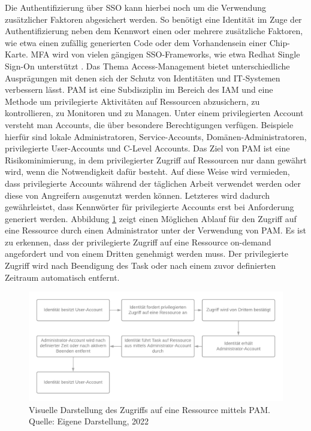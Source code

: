 Die Authentifizierung über SSO kann hierbei noch um die Verwendung zusätzlicher Faktoren abgesichert werden. So benötigt eine Identität im Zuge der Authentifizierung neben dem Kennwort einen oder mehrere zusätzliche Faktoren, wie etwa einen zufällig generierten Code oder dem Vorhandensein einer Chip-Karte. MFA wird von vielen gängigen SSO-Frameworks, wie etwa \glqq{}Redhat Single Sign-On\grqq{} unterstützt \autocite{RedHat_SSO}. 
\bigbreak
Das Thema Access-Management bietet unterschiedliche Ausprägungen mit denen sich der Schutz von Identitäten und IT-Systemen verbessern lässt. PAM ist eine Subdisziplin im Bereich des IAM und eine Methode um privilegierte Aktivitäten auf Ressourcen abzusichern, zu kontrollieren, zu Monitoren und zu Managen. Unter einem privilegierten Account versteht man Accounts, die über besondere Berechtigungen verfügen. Beispiele hierfür sind lokale Administratoren, Service-Accounts, Domänen-Administratoren, privilegierte User-Accounts und C-Level Accounts. Das Ziel von PAM ist eine Risikominimierung, in dem privilegierter Zugriff auf Ressourcen nur dann gewährt wird, wenn die Notwendigkeit dafür besteht. Auf diese Weise wird vermieden, dass privilegierte Accounts während der täglichen Arbeit verwendet werden oder diese von Angreifern ausgenutzt werden können. Letzteres wird dadurch gewährleistet, dass Kennwörter für privilegierte Accounts erst bei Anforderung generiert werden. Abbildung \ref{fig:best-practice PAM} zeigt einen Möglichen Ablauf für den Zugriff auf eine Ressource durch einen Administrator unter der Verwendung von PAM. Es ist zu erkennen, dass der privilegierte Zugriff auf eine Ressource on-demand angefordert und von einem Dritten genehmigt werden muss. Der privilegierte Zugriff wird nach Beendigung des Task oder nach einem zuvor definierten Zeitraum automatisch entfernt. \autocite{rolls_haber_2020} 

\begin{figure}[H]
    \centering
  \includegraphics[width=\linewidth]{images/uploads/a_figure_07.png}
  \caption{Visuelle Darstellung des Zugriffs auf eine Ressource mittels PAM. Quelle: Eigene Darstellung, 2022}
  \label{fig:best-practice PAM}
\end{figure}

